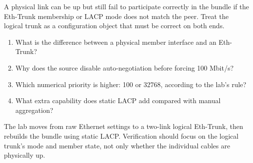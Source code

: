 \begin{pitfall}
A physical link can be up but still fail to participate correctly in the bundle if the Eth-Trunk membership or LACP mode does not match the peer. Treat the logical trunk as a configuration object that must be correct on both ends.
\end{pitfall}

\begin{quickcheck}
\begin{enumerate}
\item What is the difference between a physical member interface and an Eth-Trunk?
\item Why does the source disable auto-negotiation before forcing 100 Mbit/s?
\item Which numerical priority is higher: 100 or 32768, according to the lab's rule?
\item What extra capability does static LACP add compared with manual aggregation?
\end{enumerate}
\end{quickcheck}

\begin{chapterrecap}
The lab moves from raw Ethernet settings to a two-link logical Eth-Trunk, then rebuilds the bundle using static LACP. Verification should focus on the logical trunk's mode and member state, not only whether the individual cables are physically up.
\end{chapterrecap}
